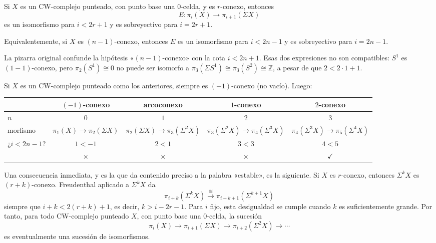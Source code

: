 \begin{teo}[Freudenthal]
Si \(X\) es un CW-complejo punteado, con punto base una $0$-celda, y es \(r\)-conexo, entonces
\[
E\colon\pi_i(X)\longrightarrow\pi_{i+1}(\Sigma X)
\]
es un isomorfismo para \(i<2r+1\) y es sobreyectivo para \(i=2r+1\).
\end{teo}

Equivalentemente, si \(X\) es \((n-1)\)-conexo, entonces \(E\) es un isomorfismo para \(i<2n-1\) y es sobreyectivo para \(i=2n-1\).
\begin{nota}
   La pizarra original confunde la hipótesis «\((n-1)\)-conexo» con la cota \(i<2n+1\). Esas dos expresiones no son compatibles: $S^1$ es $(1-1)$-conexo, pero $\pi_2(S^1)\cong0$ no puede ser isomorfo a $\pi_3(\Sigma S^1) \cong \pi_3(S^2) \cong \mathbb{Z}$, a pesar de que $2 < 2 \cdot 1 + 1$.
\end{nota}

Si $X$ es un CW-complejo punteado como los anteriores, siempre es $(-1)$-conexo (no vacío). Luego:

\begin{center}\small
\setlength{\tabcolsep}{5.5pt}
\begin{tabular}{|l|c|c|c|c|}
\hline
& \((-1)\)-conexo & arcoconexo & \(1\)-conexo & \(2\)-conexo\\
\hline
\(n\) & \(0\) & \(1\) & \(2\) & \(3\)\\
morfismo & \(\pi_1(X)\to\pi_2(\Sigma X)\) & \(\pi_2(\Sigma X)\to\pi_3(\Sigma^2X)\) & \(\pi_3(\Sigma^2X)\to\pi_4(\Sigma^3X)\) & \(\pi_4(\Sigma^3X)\to\pi_5(\Sigma^4X)\)\\
¿\(i<2n-1\)? & \(1<-1\) & \(2<1\) & \(3<3\) & \(4 < 5\)\\
& \(\times\) & \(\times\) & \(\times\) & \(\checkmark\)\\
\hline
\end{tabular}
\end{center}

Una consecuencia inmediata, y es la que da contenido preciso a la palabra «estable», es la siguiente. Si \(X\) es \(r\)-conexo, entonces \(\Sigma^kX\) es \((r+k)\)-conexo. Freudenthal aplicado a \(\Sigma^kX\) da
\[
\pi_{i+k}(\Sigma^kX)\xrightarrow{\;\cong\;}\pi_{i+k+1}(\Sigma^{k+1}X)
\]
siempre que $i+k<2(r+k)+1$, es decir, $k>i-2r-1$.
Para \(i\) fijo, esta desigualdad se cumple cuando \(k\) es suficientemente grande. Por tanto, para todo CW-complejo punteado $X$, con punto base una $0$-celda, la sucesión
\[
\pi_i(X)\longrightarrow\pi_{i+1}(\Sigma X)\longrightarrow\pi_{i+2}(\Sigma^2X)\longrightarrow\cdots
\]
es eventualmente una sucesión de isomorfismos.

